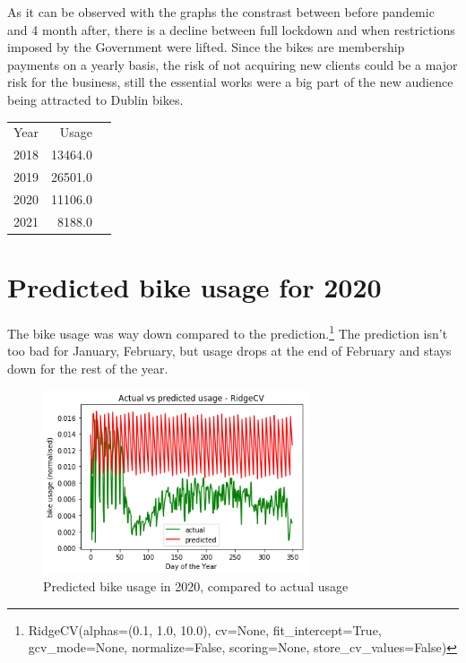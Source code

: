 \documentclass[11pt, singlecolumn, citestyle=authoryear]{elegantbook}
\begin{document}
As it can be observed with the graphs the constrast between before pandemic and  4 month after, there is a decline between full lockdown and when restrictions imposed by the Government were lifted. Since the bikes are membership payments on a yearly basis, the risk of not acquiring new clients could be a major risk for the business, still the essential works were a big part of the new audience being attracted to Dublin bikes. 

\begin{table}[h!]
	\begin{tabular}{|l|r|r|}
		Year & Usage \\
		2018 & 13464.0 \\
		2019 & 26501.0 \\ 
		2020 & 11106.0 \\ 
		2021 & 8188.0 \\ 
		
	\end{tabular} 
\end{table}

\section{Predicted bike usage for 2020}

The bike usage was way down compared to the prediction.\footnote{RidgeCV(alphas=(0.1, 1.0, 10.0), cv=None, fit\_intercept=True, gcv\_mode=None, normalize=False, scoring=None, store\_cv\_values=False)}  
The prediction isn't too bad for January, February, but usage drops at the end of February and stays down for the rest of the year.
\begin{figure}[!htbp]
	\includegraphics[width=0.7\textwidth]{../graphs/pred_2020.png}
	\caption{Predicted bike usage in 2020, compared to actual usage}
	\label{fig:surface}
\end{figure}
\end{document}
